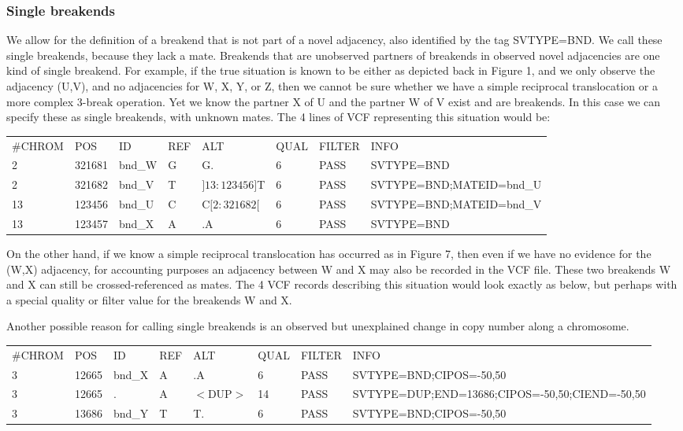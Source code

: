 \documentclass[8pt]{article}
\begin{document}
\subsubsection{Single breakends}
We allow for the definition of a breakend that is not part of a novel adjacency, also identified by the tag SVTYPE=BND. We call these single breakends, because they lack a mate. Breakends that are unobserved partners of breakends in observed novel adjacencies are one kind of single breakend. For example, if the true situation is known to be either as depicted back in Figure 1, and we only observe the adjacency (U,V), and no adjacencies for W, X, Y, or Z, then we cannot be sure whether we have a simple reciprocal translocation or a more complex 3-break operation. Yet we know the partner X of U and the partner W of V exist and are breakends. In this case we can specify these as single breakends, with unknown mates. The 4 lines of VCF representing this situation would be:

\vspace{0.3cm}
\small
\begin{tabular}{ l l l l l l l l }
\#CHROM & POS & ID & REF & ALT & QUAL & FILTER & INFO \\
2 & 321681 & bnd\_W & G & G. & 6 & PASS & SVTYPE=BND \\
2 & 321682 & bnd\_V & T & $]13:123456]$T & 6 & PASS & SVTYPE=BND;MATEID=bnd\_U \\
13 & 123456 & bnd\_U & C & C$[2:321682[$ & 6 & PASS & SVTYPE=BND;MATEID=bnd\_V \\
13 & 123457 & bnd\_X & A & .A & 6 & PASS & SVTYPE=BND \\
\end{tabular}
\normalsize
\vspace{0.3cm}

On the other hand, if we know a simple reciprocal translocation has occurred as in Figure 7, then even if we have no evidence for the (W,X) adjacency, for accounting purposes an adjacency between W and X may also be recorded in the VCF file. These two breakends W and X can still be crossed-referenced as mates. The 4 VCF records describing this situation would look exactly as below, but perhaps with a special quality or filter value for the breakends W and X.

Another possible reason for calling single breakends is an observed but unexplained change in copy number along a chromosome.

\vspace{0.3cm}
\scriptsize
\begin{tabular}{ l l l l l l l l }
\#CHROM & POS & ID & REF & ALT & QUAL & FILTER & INFO \\
3 & 12665 & bnd\_X & A & .A & 6 & PASS & SVTYPE=BND;CIPOS=-50,50 \\
3 & 12665 & . & A & $<$DUP$>$ & 14 & PASS & SVTYPE=DUP;END=13686;CIPOS=-50,50;CIEND=-50,50 \\
3 & 13686 & bnd\_Y & T & T. & 6 & PASS & SVTYPE=BND;CIPOS=-50,50 \\
\end{tabular}
\normalsize
\vspace{0.3cm}
\end{document}
